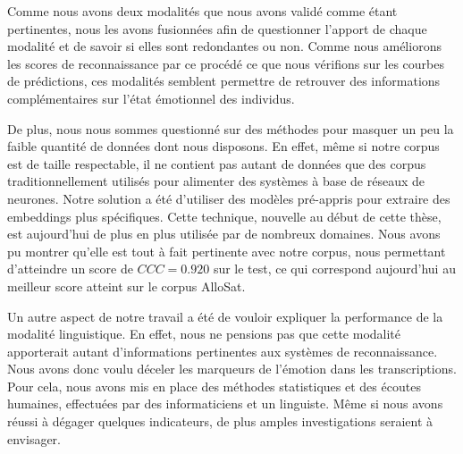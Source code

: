 Comme nous avons deux modalités que nous avons validé comme étant pertinentes, nous les avons fusionnées afin de questionner l'apport de chaque modalité et de savoir si elles sont redondantes ou non. Comme nous améliorons les scores de reconnaissance par ce procédé ce que nous vérifions sur les courbes de prédictions, ces modalités semblent permettre de retrouver des informations complémentaires sur l'état émotionnel des individus.

De plus, nous nous sommes questionné sur des méthodes pour masquer un peu la faible quantité de données dont nous disposons. En effet, même si notre corpus est de taille respectable, il ne contient pas autant de données que des corpus traditionnellement utilisés pour alimenter des systèmes à base de réseaux de neurones. Notre solution a été d'utiliser des modèles pré-appris pour extraire des embeddings plus spécifiques. Cette technique, nouvelle au début de cette thèse, est aujourd'hui de plus en plus utilisée par de nombreux domaines. Nous avons pu montrer qu'elle est tout à fait pertinente avec notre corpus, nous permettant d’atteindre un score de $CCC=0.920$ sur le test, ce qui correspond aujourd'hui au meilleur score atteint sur le corpus AlloSat.

Un autre aspect de notre travail a été de vouloir expliquer la performance de la modalité linguistique. En effet, nous ne pensions pas que cette modalité apporterait autant d'informations pertinentes aux systèmes de reconnaissance. Nous avons donc voulu déceler les marqueurs de l'émotion dans les transcriptions. Pour cela, nous avons mis en place des méthodes statistiques et des écoutes humaines, effectuées par des informaticiens et un linguiste. Même si nous avons réussi à dégager quelques indicateurs, de plus amples investigations seraient à envisager.


